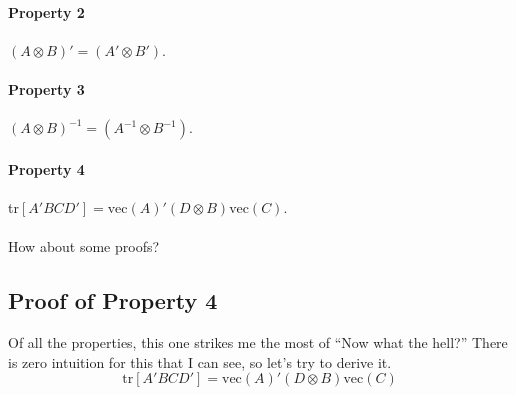 \documentclass[a4paper,12pt]{scrartcl}
\begin{document}
%
%


\paragraph{Property 2} $(A\otimes B)' = (A' \otimes B')$.

\paragraph{Property 3} $(A\otimes B)^{-1} = (A^{-1} \otimes B^{-1})$.

\paragraph{Property 4} 
tr$\left[A'BCD'\right] = \text{vec}(A)' (D \otimes B) \text{vec}(C)$.
\\
\\
How about some proofs?


\newpage
\subsection{Proof of Property 4}

Of all the properties, this one strikes me the most of 
``Now what the hell?''  There is zero intuition for this that
I can see, so let's try to derive it.
\begin{equation}
    \label{vecder}
    \text{tr}\left[A'BCD'\right] 
	= \text{vec}(A)' (D \otimes B) \text{vec}(C)
\end{equation}
\end{document}
